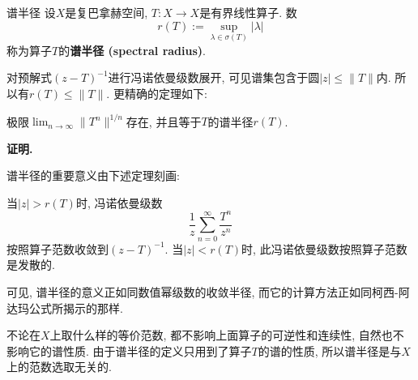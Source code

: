 
\begin{definition}{谱半径}
设$X$是复巴拿赫空间, $T:X\to X$是有界线性算子. 数
$$
r(T):=\sup_{\lambda\in\sigma(T)}|\lambda|
$$
称为算子$T$的\textbf{谱半径 (spectral radius)}.
\end{definition}

对预解式$(z-T)^{-1}$进行冯诺依曼级数展开, 可见谱集包含于圆$|z|\leq\|T\|$内. 所以有$r(T)\leq\|T\|$. 更精确的定理如下:
\begin{theorem}{}
极限$\lim_{n\to\infty}\|T^n\|^{1/n}$存在, 并且等于$T$的谱半径$r(T)$. 
\end{theorem}
\textbf{证明.} 

谱半径的重要意义由下述定理刻画:
\begin{theorem}{}
当$|z|>r(T)$时, 冯诺依曼级数
$$
\frac{1}{z}\sum_{n=0}^\infty\frac{T^n}{z^n}
$$ 
按照算子范数收敛到$(z-T)^{-1}$. 当$|z|<r(T)$时, 此冯诺依曼级数按照算子范数是发散的.
\end{theorem}

可见, 谱半径的意义正如同数值幂级数的收敛半径, 而它的计算方法正如同柯西-阿达玛公式所揭示的那样.

不论在$X$上取什么样的等价范数, 都不影响上面算子的可逆性和连续性, 自然也不影响它的谱性质. 由于谱半径的定义只用到了算子$T$的谱的性质, 所以谱半径是与$X$上的范数选取无关的. 